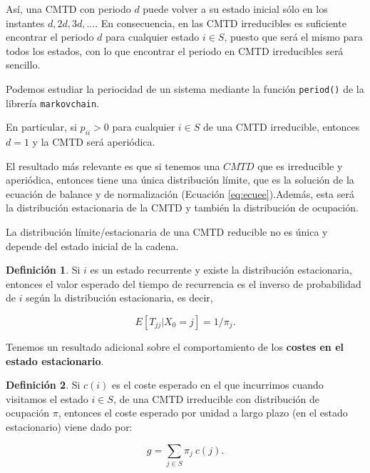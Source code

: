 \documentclass[
]{book}
\newenvironment{yellowbox}{
  \definecolor{shadecolor}{rgb}{210, 180, 140}  
  \color{black}
  \begin{shaded}}
 {\end{shaded}}
\newenvironment{whitebox}{
  \definecolor{shadecolor}{rgb}{255, 255, 255}  
  \color{black}
  \begin{shaded}}
 {\end{shaded}}
\theoremstyle{definition}
\newtheorem{definition}{Definición}[chapter]
\theoremstyle{definition}
\theoremstyle{definition}
\theoremstyle{definition}
\theoremstyle{remark}
\begin{document}
Así, una CMTD con periodo \(d\) puede volver a su estado inicial sólo en los instantes \(d, 2d, 3d, ...\). En consecuencia, en las CMTD irreducibles es suficiente encontrar el periodo \(d\) para cualquier estado \(i \in S\), puesto que será el mismo para todos los estados, con lo que encontrar el periodo en CMTD irreducibles será sencillo.

\begin{whitebox}
Podemos estudiar la periocidad de un sistema mediante la función \texttt{period()} de la librería \texttt{markovchain}.

\end{whitebox}

En particular, si \(p_{ii}>0\) para cualquier \(i\in S\) de una CMTD irreducible, entonces \(d=1\) y la CMTD será aperiódica.

El resultado más relevante es que si tenemos una \(CMTD\) que es irreducible y aperiódica, entonces tiene una única distribución límite, que es la solución de la ecuación de balance y de normalización (Ecuación \eqref{eq:ecuee}).Además, esta será la distribución estacionaria de la CMTD y también la distribución de ocupación.

La distribución límite/estacionaria de una CMTD reducible no es única y depende del estado inicial de la cadena.

\begin{yellowbox}

\begin{definition}
Si \(i\) es un estado recurrente y existe la distribución estacionaria, entonces el valor esperado del tiempo de recurrencia es el inverso de probabilidad de \(i\) según la distribución estacionaria, es decir,

\[E[T_{jj}|X_0=j] = 1/\pi_j.\]
\end{definition}

\end{yellowbox}

Tenemos un resultado adicional sobre el comportamiento de los \textbf{costes en el estado estacionario}.

\begin{yellowbox}

\begin{definition}
\protect\hypertarget{def:costesestacionarios}{}\label{def:costesestacionarios}Si \(c(i)\) es el coste esperado en el que incurrimos cuando visitamos el estado \(i \in S\), de una CMTD irreducible con distribución de ocupación \(\pi\), entonces el coste esperado por unidad a largo plazo (en el estado estacionario) viene dado por:

\[g= \sum_{j\in S} \pi_j \ c(j).\]
\end{definition}

\end{yellowbox}
\end{document}
